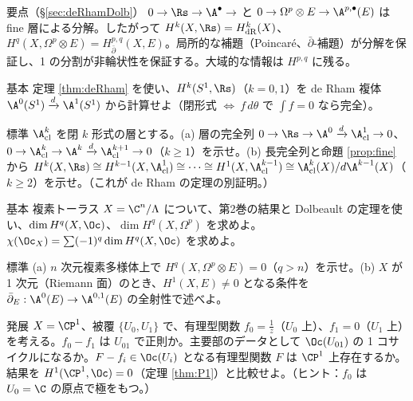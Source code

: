 \begin{keybox}{要点（§\ref{sec:deRhamDolb}）}
$0\to\Rs\to\A^\bullet\to$ と $0\to\Omega^p\otimes E\to\A^{p,\bullet}(E)$ は fine 層による分解。したがって $H^k(X,\Rs)=H^k_{\mathrm{dR}}(X)$、$H^q(X,\Omega^p\otimes E)=H^{p,q}_{\bar\partial}(X,E)$。局所的な補題（Poincar\'e、$\bar\partial$-補題）が分解を保証し、1 の分割が非輪状性を保証する。大域的な情報は $H^{p,q}$ に残る。
\end{keybox}

\begin{prob}{基本}\label{p:dRS1}
定理 \ref{thm:deRham} を使い、$H^k(S^1,\Rs)$（$k=0,1$）を de Rham 複体 $\A^0(S^1)\xrightarrow{d}\A^1(S^1)$ から計算せよ（閉形式 $\Leftrightarrow\ f\,d\theta$ で $\int f=0$ なら完全）。
\end{prob}
\begin{prob}{標準}\label{p:closedforms}
$\A^k_{\mathrm{cl}}$ を閉 $k$ 形式の層とする。(a) 層の完全列 $0\to\Rs\to\A^0\xrightarrow{d}\A^1_{\mathrm{cl}}\to0$、$0\to\A^{k}_{\mathrm{cl}}\to\A^k\xrightarrow{d}\A^{k+1}_{\mathrm{cl}}\to0$（$k\ge1$）を示せ。(b) 長完全列と命題 \ref{prop:fine} から $H^{k}(X,\Rs)\cong H^{k-1}(X,\A^1_{\mathrm{cl}})\cong\cdots\cong H^1(X,\A^{k-1}_{\mathrm{cl}})\cong\A^k_{\mathrm{cl}}(X)/d\A^{k-1}(X)$（$k\ge2$）を示せ。（これが de Rham の定理の別証明。）
\end{prob}
\begin{prob}{基本}\label{p:torusH}
複素トーラス $X=\C^n/\Lambda$ について、第2巻の結果と Dolbeault の定理を使い、$\dim H^q(X,\Oc)$、$\dim H^q(X,\Omega^p)$ を求めよ。$\chi(\Oc_X)=\sum(-1)^q\dim H^q(X,\Oc)$ を求めよ。
\end{prob}
\begin{prob}{標準}\label{p:vanishnq}
(a) $n$ 次元複素多様体上で $H^q(X,\Omega^p\otimes E)=0$（$q>n$）を示せ。(b) $X$ が 1 次元（Riemann 面）のとき、$H^1(X,E)\ne0$ となる条件を $\bar\partial_E:\A^0(E)\to\A^{0,1}(E)$ の全射性で述べよ。
\end{prob}
\begin{prob}{発展}\label{p:cousinpoly}
$X=\CP^1$、被覆 $\{U_0,U_1\}$ で、有理型関数 $f_0=\frac1z$（$U_0$ 上）、$f_1=0$（$U_1$ 上）を考える。$f_0-f_1$ は $U_{01}$ で正則か。主要部のデータとして $\Oc(U_{01})$ の 1 コサイクルになるか。$F-f_i\in\Oc(U_i)$ となる有理型関数 $F$ は $\CP^1$ 上存在するか。結果を $H^1(\CP^1,\Oc)=0$（定理 \ref{thm:P1}）と比較せよ。（ヒント：$f_0$ は $U_0=\C$ の原点で極をもつ。）
\end{prob}


